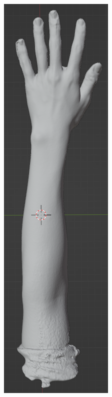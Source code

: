 \documentclass{ltjsreport}
\begin{document}
		\begin{figure}[H]
		\centering
		\begin{minipage}{0.11\columnwidth}
		\centering
		\includegraphics[width = \columnwidth]{../figs/SmoothingBeforALL.png}

\end{minipage}
\end{figure}
\end{document}
